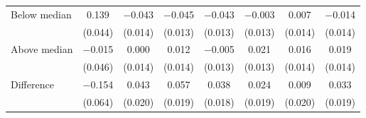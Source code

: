 \begin{tabular}[t]{lccccccc}
\hspace{1em} Below median & \num{0.139} & \num{-0.043} & \num{-0.045} & \num{-0.043} & \num{-0.003} & \num{0.007} & \num{-0.014}\\
 & (\num{0.044}) & (\num{0.014}) & (\num{0.013}) & (\num{0.013}) & (\num{0.013}) & (\num{0.014}) & (\num{0.014})\\
\hspace{1em} Above median & \num{-0.015} & \num{0.000} & \num{0.012} & \num{-0.005} & \num{0.021} & \num{0.016} & \num{0.019}\\
 & (\num{0.046}) & (\num{0.014}) & (\num{0.014}) & (\num{0.013}) & (\num{0.013}) & (\num{0.014}) & (\num{0.014})\\\cmidrule(lr){2-8}
\hspace{1em} Difference & \num{-0.154} & \num{0.043} & \num{0.057} & \num{0.038} & \num{0.024} & \num{0.009} & \num{0.033}\\
 & (\num{0.064}) & (\num{0.020}) & (\num{0.019}) & (\num{0.018}) & (\num{0.019}) & (\num{0.020}) & (\num{0.019})\\
\end{tabular}
